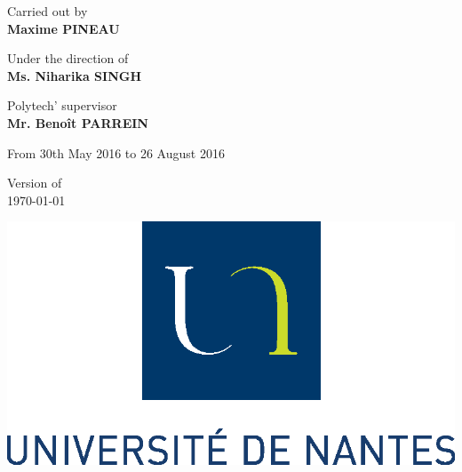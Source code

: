 \begin{titlepage}
\begin{center}
\begin{minipage}[t]{0.3\textwidth}
	\begin{center}
		\Large{Carried out by} \\
		\Large{\textbf{Maxime PINEAU}} 
	\end{center}
\end{minipage}
\begin{minipage}[t]{0.3\textwidth}
	\begin{center}
		\Large{Under the direction of} \\
		\Large{\textbf{Ms. Niharika SINGH}} 
	\end{center}
\end{minipage} 
\begin{minipage}[t]{0.3\textwidth}
	\begin{center}
		\Large{Polytech' supervisor} \\
		\Large{\textbf{Mr. Benoît PARREIN}} 
	\end{center}
\end{minipage} 




\vfill





\Large{From 30th May 2016 to 26 August 2016}

\vfill

\large{Version of} \\
\large{\today} 

\vfill

\includegraphics[scale=0.6]{images/logo_ecoles/Universite_de_Nantes_} 


\end{center}
\end{titlepage}
